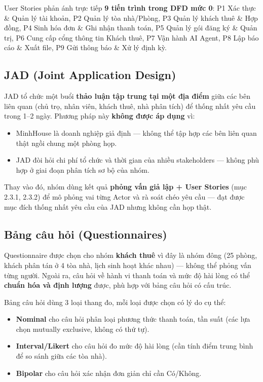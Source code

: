 \documentclass[12pt,a4paper]{report}
\begin{document}
User Stories phản ánh trực tiếp \textbf{9 tiến trình trong DFD mức 0}: P1 Xác thực \& Quản lý tài khoản, P2 Quản lý tòa nhà/Phòng, P3 Quản lý khách thuê \& Hợp đồng, P4 Sinh hóa đơn \& Ghi nhận thanh toán, P5 Quản lý gói đăng ký \& Quản trị, P6 Cung cấp cổng thông tin Khách thuê, P7 Vận hành AI Agent, P8 Lập báo cáo \& Xuất file, P9 Gửi thông báo \& Xử lý định kỳ.

\subsection{JAD (Joint Application Design)}

JAD tổ chức một buổi \textbf{thảo luận tập trung tại một địa điểm} giữa các bên liên quan (chủ trọ, nhân viên, khách thuê, nhà phân tích) để thống nhất yêu cầu trong 1--2 ngày. Phương pháp này \textbf{không được áp dụng} vì:

\begin{itemize}[leftmargin=1.2em,itemsep=2pt]
  \item MinhHouse là doanh nghiệp giả định --- không thể tập hợp các bên liên quan thật ngồi chung một phòng họp.
  \item JAD đòi hỏi chi phí tổ chức và thời gian của nhiều stakeholders --- không phù hợp ở giai đoạn phân tích sơ bộ của nhóm.
\end{itemize}

Thay vào đó, nhóm dùng kết quả \textbf{phỏng vấn giả lập + User Stories} (mục 2.3.1, 2.3.2) để mô phỏng vai từng Actor và rà soát chéo yêu cầu --- đạt được mục đích thống nhất yêu cầu của JAD nhưng không cần họp thật.

\subsection{Bảng câu hỏi (Questionnaires)}

Questionnaire được chọn cho nhóm \textbf{khách thuê} vì đây là nhóm đông (25 phòng, khách phân tán ở 4 tòa nhà, lịch sinh hoạt khác nhau) --- không thể phỏng vấn từng người. Ngoài ra, câu hỏi về hành vi thanh toán và mức độ hài lòng có thể \textbf{chuẩn hóa và định lượng} được, phù hợp với bảng câu hỏi có cấu trúc.

Bảng câu hỏi dùng 3 loại thang đo, mỗi loại được chọn có lý do cụ thể:

\begin{itemize}[leftmargin=1.2em,itemsep=2pt]
  \item \textbf{Nominal} cho câu hỏi phân loại phương thức thanh toán, tần suất (các lựa chọn mutually exclusive, không có thứ tự).
  \item \textbf{Interval/Likert} cho câu hỏi đo mức độ hài lòng (cần tính điểm trung bình để so sánh giữa các tòa nhà).
  \item \textbf{Bipolar} cho câu hỏi xác nhận đơn giản chỉ cần Có/Không.
\end{itemize}
\end{document}
